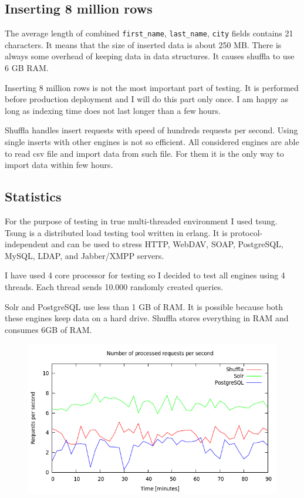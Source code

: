 \documentclass[10pt,a4paper]{article}
\begin{document}
\subsection{Inserting 8 million rows}

The average length of combined \verb|first_name|, \verb|last_name|, \verb|city| fields contains 21 characters. It means that the size of inserted data is about 250 MB. There is always some overhead of keeping data in data structures. It causes shuffla to use 6 GB RAM.

Inserting 8 million rows is not the most important part of testing. It is performed before production deployment and I will do this part only once. I am happy as long as indexing time does not last longer than a few hours. 

Shuffla handles insert requests with speed of hundreds requests per second. Using single inserts with other engines is not so efficient. All considered engines are able to read csv file and import data from such file. For them it is the only way to import data within few hours.

\subsection{Statistics}

For the purpose of testing in true multi-threaded environment I used tsung. Tsung is a distributed load testing tool written in erlang. It is protocol-independent and can be used to stress HTTP, WebDAV, SOAP, PostgreSQL, MySQL, LDAP, and Jabber/XMPP servers. 

I have used 4 core processor for testing so I decided to test all engines using 4 threads. Each thread sends 10.000 randomly created queries. 

Solr and PostgreSQL use less than 1 GB of RAM. It is possible because both these engines keep data on a hard drive. Shuffla stores everything in RAM and consumes 6GB of RAM. 

\begin{figure}[h!]
\centering
  \includegraphics[width=12cm]{request_count_tn}
  \label{fig:request_count_tn}
\end{figure}
\end{document}
